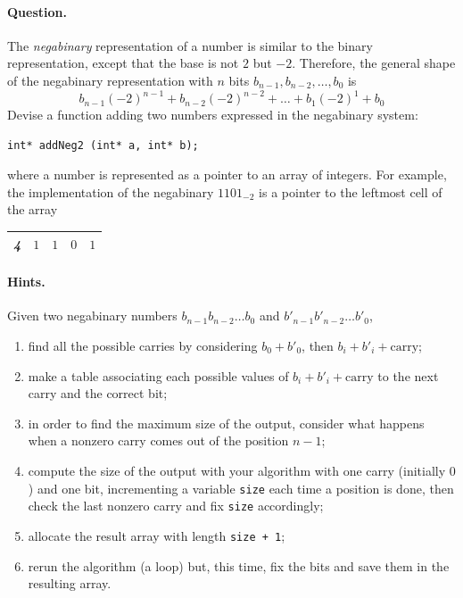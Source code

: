 \paragraph{Question.} The \emph{negabinary} representation of a number
is similar to the binary representation, except that the base is not
\(2\) but \(-2\). Therefore, the general shape of the negabinary
representation with \(n\) bits \(b_{n-1}, b_{n-2}, \dots, b_0\) is
\[
b_{n-1}(-2)^{n-1} + b_{n-2}(-2)^{n-2} + \dots + b_1(-2)^1 + b_0
\]
Devise a \C function adding two numbers expressed in the negabinary
system: {\small
\begin{verbatim}
int* addNeg2 (int* a, int* b);
\end{verbatim}
}
\noindent where a number is represented as a pointer to an array of
integers. For example, the implementation of the negabinary
\(1101_{-2}\) is a pointer to the leftmost cell of the array
\begin{center}
\begin{tabular}{|c|c|c|c|c|}
\hline
\emph{\textbf{4}} & \(1\) & \(1\) & \(0\) & \(1\)\\
\hline
\end{tabular}
\end{center}

\paragraph{Hints.} Given two negabinary numbers \(b_{n-1}b_{n-2}\dots{b_0}\)
and \(b'_{n-1}b'_{n-2}\dots{b'_0}\),
\begin{enumerate}

   \item find all the possible carries by considering \(b_0 + b'_0\),
     then \(b_i + b'_i + \text{carry}\);

  \item make a table associating each possible values of \(b_i + b'_i
    + \text{carry}\) to the next carry and the correct bit;

  \item in order to find the maximum size of the output, consider what
    happens when a nonzero carry comes out of the position \(n-1\);

  \item compute the size of the output with your algorithm with one
    carry (initially \(0\)) and one bit, incrementing a variable
    \texttt{size} each time a position is done, then check the last
    nonzero carry and fix \texttt{size} accordingly;

  \item allocate the result array with length \texttt{size + 1};

  \item rerun the algorithm (a loop) but, this time, fix the bits and
    save them in the resulting array.

\end{enumerate}
